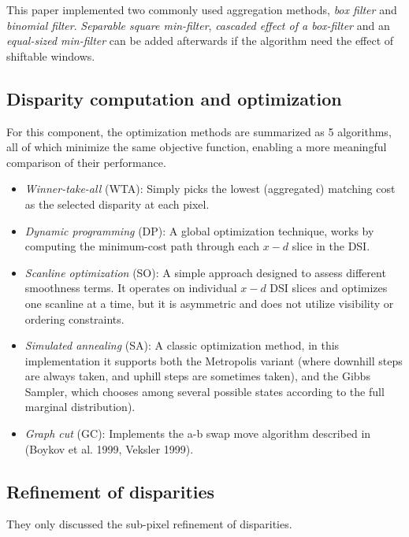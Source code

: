 \documentclass[10pt,twocolumn,letterpaper]{article}
\begin{document}
This paper implemented two commonly used aggregation methods, 
{\em box filter} and {\em binomial filter}.
{\em Separable square min-filter}, 
{\em cascaded effect of a box-filter} and an
{\em equal-sized min-filter} can be added afterwards if 
the algorithm need the effect of shiftable windows.
\subsection{Disparity computation and optimization}
For this component, the optimization methods are summarized as 5 algorithms, 
all of which minimize the same 
objective function, enabling a more meaningful comparison of their performance.
\begin{itemize}
\item {\em Winner-take-all} (WTA): Simply picks the 
lowest (aggregated) matching cost as the selected
disparity at each pixel.
\item {\em Dynamic programming} (DP): A global 
optimization technique, works by computing the minimum-cost
path through each $x-d$ slice in the DSI.
\item {\em Scanline optimization} (SO): A simple approach 
designed to assess different smoothness terms. It operates on 
individual $x-d$ DSI slices and optimizes one scanline at a time, 
but it is asymmetric and does not utilize visibility or ordering constraints.
\item {\em Simulated annealing} (SA): A classic optimization method, 
in this implementation it supports both the Metropolis variant (where downhill
steps are always taken, and uphill steps are sometimes taken), and the Gibbs Sampler, which
chooses among several possible states according to the full marginal distribution).
\item {\em Graph cut} (GC): Implements the a-b swap move algorithm described
in (Boykov et al. 1999, Veksler 1999).
\end{itemize}


\subsection{Refinement of disparities}
They only discussed the sub-pixel refinement of disparities.

\end{document}
